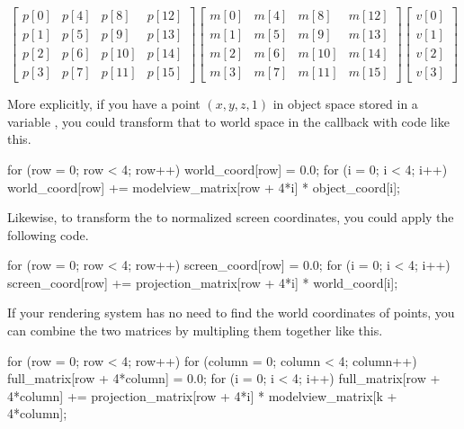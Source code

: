 \begin{displaymath}
  \left[
    \begin{array}{cccc}
      p[0] & p[4] & p[8] & p[12] \\
      p[1] & p[5] & p[9] & p[13] \\
      p[2] & p[6] & p[10] & p[14] \\
      p[3] & p[7] & p[11] & p[15]
    \end{array}
  \right]
  \left[
    \begin{array}{cccc}
      m[0] & m[4] & m[8] & m[12] \\
      m[1] & m[5] & m[9] & m[13] \\
      m[2] & m[6] & m[10] & m[14] \\
      m[3] & m[7] & m[11] & m[15]
    \end{array}
  \right]
  \left[
    \begin{array}{c}
      v[0] \\ v[1] \\ v[2] \\ v[3]
    \end{array}
  \right]
\end{displaymath}

More explicitly, if you have a point $(x, y, z, 1)$ in object space stored
in a variable , you could transform that to world
space in the callback with code like this.

\begin{code}
for (row = 0; row < 4; row++) {
    world_coord[row] = 0.0;
    for (i = 0; i < 4; i++) {
        world_coord[row] += modelview_matrix[row + 4*i] * object_coord[i];
    }
}
\end{code}

Likewise, to transform the  to normalized screen
coordinates, you could apply the following code.

\begin{code}
for (row = 0; row < 4; row++) {
    screen_coord[row] = 0.0;
    for (i = 0; i < 4; i++) {
        screen_coord[row] += projection_matrix[row + 4*i] * world_coord[i];
    }
}
\end{code}

If your rendering system has no need to find the world coordinates of
points, you can combine the two matrices by multipling them together like
this.

\begin{code}
for (row = 0; row < 4; row++) {
    for (column = 0; column < 4; column++) {
        full_matrix[row + 4*column] = 0.0;
        for (i = 0; i < 4; i++) {
            full_matrix[row + 4*column] +=
                projection_matrix[row + 4*i] * modelview_matrix[k + 4*column];
        }
    }
}
\end{code}

